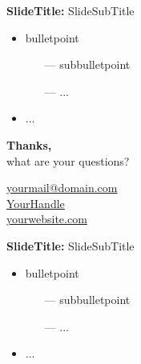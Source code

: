 \documentclass{beamer} %
\begin{document}
\begin{frame}{\textbf{SlideTitle:} SlideSubTitle}
	\begin{itemize}
	    \item bulletpoint
    	\begin{itemize}
    	    \item[---] subbulletpoint
    	    \item[---] ...
    	\end{itemize}
    	\item ...
	\end{itemize}
\end{frame}

{
    \begin{frame}[plain]
    	\vspace{1.5cm}
    	{\color{white}\huge \textbf{Thanks,}\\ \vspace{.4cm} \Large what are your questions?}
    		
    	\vspace{2.5cm}
    	
    	\hspace{7cm}\circled{{\color{ifo-blue}\fontsize{8}{9}\faEnvelope}} \hspace{.1cm} {\footnotesize \color{white} \href{mailto:yourmail@domain.com}{yourmail@domain.com}}\\ %
    	\hspace{7cm}\circled{{\color{ifo-blue}\footnotesize\faTwitter}} \hspace{.1cm} {\footnotesize \color{white} \href{#}{YourHandle}}\\ %
    	\hspace{7cm}\circled{{\color{ifo-blue}\footnotesize\faHome}} \hspace{.1cm} {\footnotesize \color{white} \href{#}{yourwebsite.com}}\\ %
    \end{frame}
    \addtocounter{framenumber}{-1}
}

\appendix
\backupbegin
\renewcommand{\theframenumber}{\Roman{framenumber}}

\begin{frame}[label=appendix]{\textbf{SlideTitle:} SlideSubTitle}
	\begin{itemize}
	    \item bulletpoint
    	\begin{itemize}
    	    \item[---] subbulletpoint
    	    \item[---] ...
    	\end{itemize}
    	\item ...
	\end{itemize}
\end{frame}

\backupend
\end{document}
